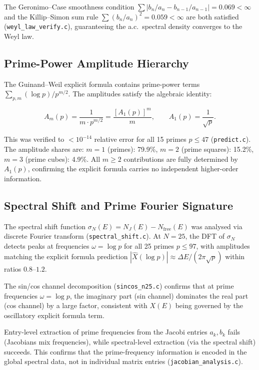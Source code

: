 \documentclass{pre-aomart}
\def\xi{X}%
\theoremstyle{plain}
\theoremstyle{definition}
\theoremstyle{remark}
\begin{document}
The Geronimo--Case smoothness condition
$\sum |b_n/a_n - b_{n-1}/a_{n-1}| = 0.069 < \infty$ and the
Killip--Simon sum rule $\sum (b_n/a_n)^2 = 0.059 < \infty$ are both
satisfied (\texttt{weyl\_law\_verify.c}), guaranteeing the a.c.\ spectral
density converges to the Weyl law.

\subsection{Prime-Power Amplitude Hierarchy}

The Guinand--Weil explicit formula contains prime-power terms
$\sum_{p,m} (\log p)/p^{m/2}$.  The amplitudes satisfy the algebraic identity:

\begin{equation}
A_m(p) = \frac{1}{m \cdot p^{m/2}}
       = \frac{[A_1(p)]^m}{m}, \qquad
A_1(p) = \frac{1}{\sqrt{p}}.
\end{equation}

This was verified to $< 10^{-14}$ relative error for all 15 primes $p \le 47$
(\texttt{predict.c}).  The amplitude shares are:
$m=1$ (primes): 79.9\%, $m=2$ (prime squares): 15.2\%,
$m=3$ (prime cubes): 4.9\%.  All $m \ge 2$ contributions are fully determined
by $A_1(p)$, confirming the explicit formula carries no independent
higher-order information.

\subsection{Spectral Shift and Prime Fourier Signature}

The spectral shift function $\sigma_N(E) = N_J(E) - N_{\text{free}}(E)$ was
analysed via discrete Fourier transform (\texttt{spectral\_shift.c}).
At $N=25$, the DFT of $\sigma_N$ detects peaks at frequencies
$\omega = \log p$ for all 25 primes $p \le 97$, with amplitudes matching
the explicit formula prediction $|\hat{\xi}(\log p)| \approx \Delta E/(2\pi\sqrt{p})$
within ratios $0.8$--$1.2$.

The sin/cos channel decomposition (\texttt{sincos\_n25.c}) confirms that
at prime frequencies $\omega = \log p$, the imaginary part (sin channel)
dominates the real part (cos channel) by a large factor, consistent with
$\xi(E)$ being governed by the oscillatory explicit formula term.

Entry-level extraction of prime frequencies from the Jacobi entries $a_k, b_k$
fails (Jacobians mix frequencies), while spectral-level extraction
(via the spectral shift) succeeds.  This confirms that the prime-frequency
information is encoded in the global spectral data, not in individual
matrix entries (\texttt{jacobian\_analysis.c}).
\end{document}
